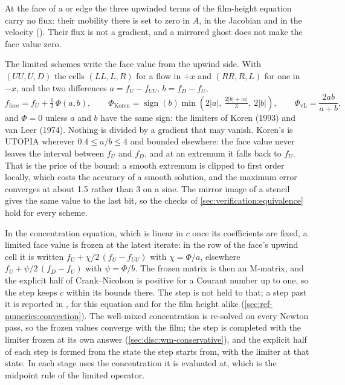 At the face of a  or  edge the three
upwinded terms of the film-height equation carry no flux: their mobility there
is set to zero in $A$, in the Jacobian and in the velocity
(). Their flux is not a gradient, and a
mirrored ghost does not make the face value zero.

The limited schemes write the face value from the upwind side. With
$(UU, U, D)$ the cells $(LL, L, R)$ for a flow in $+x$ and $(RR, R, L)$ for one
in $-x$, and the two differences $a = f_U - f_{UU}$, $b = f_D - f_U$,
%
\begin{equation}
  f_{\text{face}} = f_U + \tfrac12\,\Phi(a, b), \qquad
  \Phi_{\text{Koren}} = \operatorname{sign}(b)\min\!\left(2|a|,\ \tfrac{2|b| + |a|}{3},\ 2|b|\right), \qquad
  \Phi_{\text{vL}} = \frac{2ab}{a + b},
  \label{eq:disc:limited}
\end{equation}
%
and $\Phi = 0$ unless $a$ and $b$ have the same sign: the limiters of Koren
(1993) and van Leer (1974). Nothing is divided by a gradient that may vanish. Koren's is UTOPIA wherever $0.4 \le a/b \le 4$ and
bounded elsewhere: the face value never leaves the interval between $f_U$ and
$f_D$, and at an extremum it falls back to $f_U$. That is the price of the
bound: a smooth extremum is clipped to first order locally, which costs the
accuracy of a smooth solution, and the maximum error converges at about 1.5
rather than 3 on a sine. The mirror image of a stencil gives the same value
to the last bit, so the checks of \cref{sec:verification:equivalence} hold for
every scheme.

In the concentration equation, which is linear in $c$ once its coefficients
are fixed, a limited face value is frozen at the latest iterate: in the row of
the face's upwind cell it is written $f_U + \chi/2\,(f_U - f_{UU})$ with
$\chi = \Phi/a$, elsewhere $f_U + \psi/2\,(f_D - f_U)$ with $\psi = \Phi/b$. The
frozen matrix is then an M-matrix, and the explicit half of Crank--Nicolson is
positive for a Courant number up to one, so the step keeps $c$ within its
bounds there. The step is not held to that; a step past it is reported in
, for this equation and for the film height alike
(\cref{sec:ref-numerics:convection}). The well-mixed concentration is re-solved on every Newton pass,
so the frozen values converge with the film; the step is completed with the
limiter frozen at its own answer (\cref{sec:disc:wm-conservative}), and the
explicit half of each step is formed from the state the step starts from,
with the limiter at that state. In  each
stage uses the concentration it is evaluated at, which is the midpoint rule of
the limited operator.

